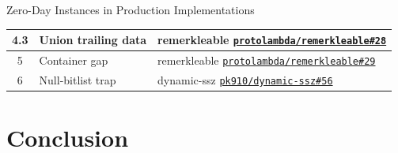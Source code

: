 \documentclass[aspectratio=169, 10pt, xcolor={table,dvipsnames}]{beamer}
\begin{document}
\begin{frame}{Zero-Day Instances in Production Implementations}
\begin{table}
\begin{tabular}{c l l}
            \rowcolor{efred!15} 4.3 & Union trailing data & remerkleable \href{https://github.com/protolambda/remerkleable/issues/28}{\texttt{protolambda/remerkleable\#28}} \\
            \hline
            5 & Container gap & remerkleable \href{https://github.com/protolambda/remerkleable/issues/29}{\texttt{protolambda/remerkleable\#29}} \\
            6 & Null-bitlist trap & dynamic-ssz \href{https://github.com/pk910/dynamic-ssz/issues/56}{\texttt{pk910/dynamic-ssz\#56}} \\
            \bottomrule
        \end{tabular}
    \end{table}
\end{frame}


\section{Conclusion}
\end{document}
